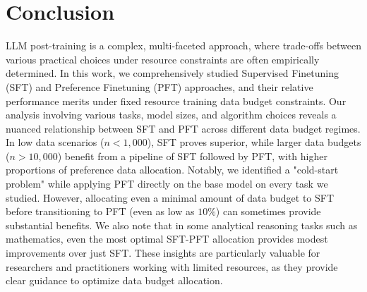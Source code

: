 \section{Conclusion}

LLM post-training is a complex, multi-faceted approach, where trade-offs between various practical choices under resource constraints are often empirically determined. In this work, we comprehensively studied Supervised Finetuning (SFT) and Preference Finetuning (PFT) approaches, and their relative performance merits under fixed resource training data budget constraints. Our analysis involving various tasks, model sizes, and algorithm choices reveals a nuanced relationship between SFT and PFT across different data budget regimes. In low data scenarios ($n < 1,000$), SFT proves superior, while larger data budgets ($n > 10,000$) benefit from a pipeline of SFT followed by PFT, with higher proportions of preference data allocation. Notably, we identified a "cold-start problem" while applying PFT directly on the base model on every task we studied. However, allocating even a minimal amount of data budget to SFT before transitioning to PFT (even as low as $10\%$) can sometimes provide substantial benefits. We also note that in some analytical reasoning tasks such as mathematics, even the most optimal SFT-PFT allocation provides modest improvements over just SFT. These insights are particularly valuable for researchers and practitioners working with limited resources, as they provide clear guidance to optimize data budget allocation. 

